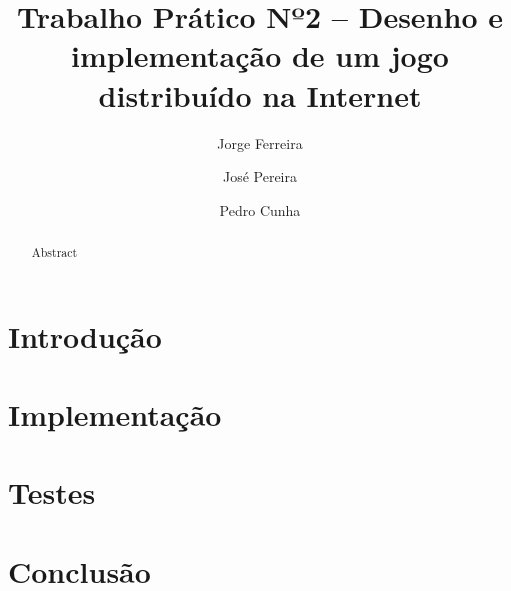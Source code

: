 \documentclass{llncs}
\begin{document}
\title{Trabalho Prático Nº2 – Desenho e implementação de um jogo distribuído na Internet}
\author{Jorge Ferreira \and José Pereira \and  Pedro Cunha}
\maketitle

\begin{abstract}
Abstract
\end{abstract}

\section{Introdução}

\section{Implementação}
\section{Testes}
\section{Conclusão}
\end{document}
